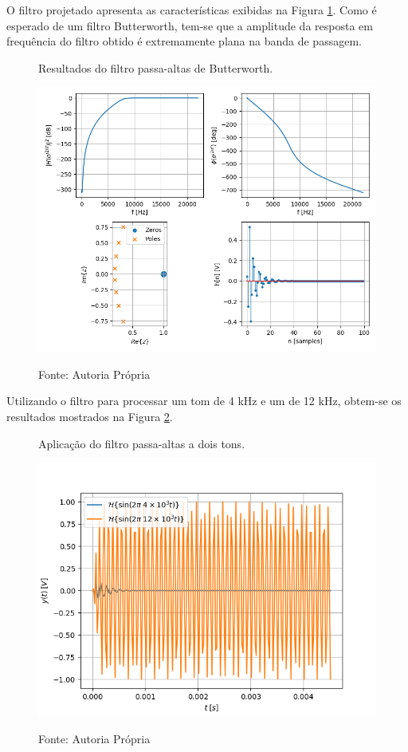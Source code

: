 \documentclass[12pt,a4paper]{report}
\begin{document}
  O filtro projetado apresenta as características exibidas na Figura \ref{fig:butter_results}. Como é esperado
  de um filtro Butterworth, tem-se que a amplitude da resposta em frequência do filtro obtido é extremamente
  plana na banda de passagem.
  \begin{figure}[H]
    \caption{Resultados do filtro passa-altas de Butterworth.}
    \centering
    \includegraphics[width=\textwidth]{images/butter_results}
    \label{fig:butter_results}
    \caption*{Fonte: Autoria Própria}
  \end{figure}

  Utilizando o filtro para processar um tom de 4 kHz e um de 12 kHz, obtem-se os resultados mostrados na Figura
  \ref{fig:butter_tones}.
  \begin{figure}[H]
    \caption{Aplicação do filtro passa-altas a dois tons.}
    \centering
    \includegraphics[width=\textwidth]{images/butter_tones}
    \label{fig:butter_tones}
    \caption*{Fonte: Autoria Própria}
  \end{figure}
\end{document}
